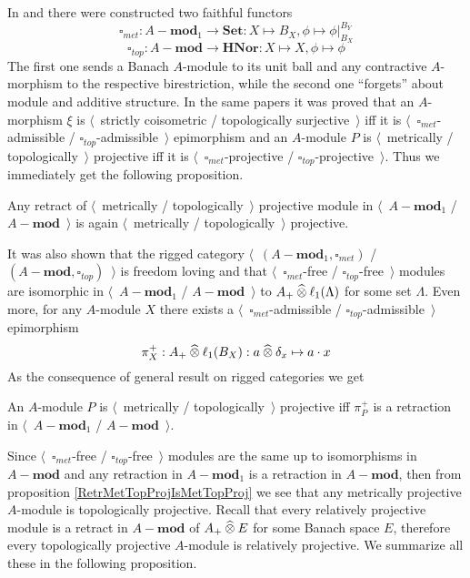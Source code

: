In \cite{HelMetrFrQMod} and \cite{ShtTopFrClassicQuantMod} there were constructed two faithful functors 
$$
\square_{met}:A-\mathbf{mod}_1\to\mathbf{Set}:X\mapsto B_X,\phi\mapsto\phi|_{B_X}^{B_Y}
$$
$$
\square_{top}:A-\mathbf{mod}\to\mathbf{HNor}:X\mapsto X,\phi\mapsto\phi
$$
The first one sends a Banach $A$-module to its unit ball and any contractive $A$-morphism to the respective birestriction, while the second one ``forgets'' about module and additive structure.
In the same papers it was proved that an $A$-morphism $\xi$ is $\langle$~strictly coisometric / topologically surjective~$\rangle$ iff it is $\langle$~$\square_{met}$-admissible / $\square_{top}$-admissible~$\rangle$ epimorphism and an $A$-module $P$ is $\langle$~metrically / topologically~$\rangle$ projective iff it is $\langle$~$\square_{met}$-projective / $\square_{top}$-projective~$\rangle$. Thus we immediately get the following proposition.

\begin{proposition}\label{RetrMetTopProjIsMetTopProj} Any retract of $\langle$~metrically / topologically~$\rangle$ projective module in $\langle$~$A-\mathbf{mod}_1$ / $A-\mathbf{mod}$~$\rangle$ is again $\langle$~metrically / topologically~$\rangle$ projective.
\end{proposition}

It was also shown that the rigged category $\langle$~$(A-\mathbf{mod}_1,\square_{met})$ / $(A-\mathbf{mod},\square_{top})$~$\rangle$ is freedom loving and that $\langle$~$\square_{met}$-free / $\square_{top}$-free~$\rangle$ modules are isomorphic in $\langle$~$A-\mathbf{mod}_1$ / $A-\mathbf{mod}$~$\rangle$ to $A_+\mathbin{\widehat{\otimes}} \ell_1(\Lambda)$ for some set $\Lambda$. Even more, for any $A$-module $X$ there exists a $\langle$~$\square_{met}$-admissible / $\square_{top}$-admissible~$\rangle$ epimorphism
$$
\pi_X^+:A_+\mathbin{\widehat{\otimes}} \ell_1(B_X):a\mathbin{\widehat{\otimes}} \delta_x\mapsto a\cdot x
$$
As the consequence of general result on rigged categories we get

\begin{proposition}\label{MetTopProjModViaCanonicMorph}
An $A$-module $P$ is $\langle$~metrically / topologically~$\rangle$ projective iff $\pi_P^+$ is a retraction in $\langle$~$A-\mathbf{mod}_1$ / $A-\mathbf{mod}$~$\rangle$.
\end{proposition}

Since $\langle$~$\square_{met}$-free / $\square_{top}$-free~$\rangle$ modules are the same up to isomorphisms in $A-\mathbf{mod}$ and any retraction in $A-\mathbf{mod}_1$ is a retraction in $A-\mathbf{mod}$, then from proposition \ref{RetrMetTopProjIsMetTopProj} we see that any metrically projective $A$-module is topologically projective. Recall that every relatively projective module is a retract in $A-\mathbf{mod}$ of $A_+\mathbin{\widehat{\otimes}} E$ for some Banach space $E$, therefore every topologically projective $A$-module is relatively projective. We summarize all these in the following proposition.

